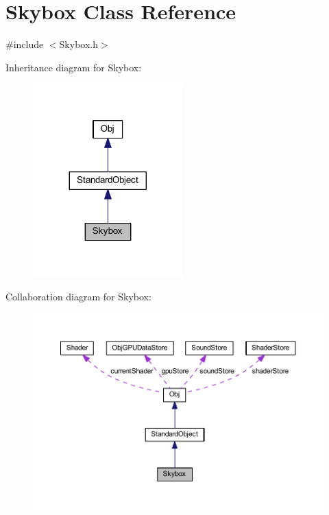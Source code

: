\hypertarget{class_skybox}{}\section{Skybox Class Reference}
\label{class_skybox}


{\ttfamily \#include $<$Skybox.\+h$>$}



Inheritance diagram for Skybox\+:
\nopagebreak
\begin{figure}[H]
\begin{center}
\leavevmode
\includegraphics[width=164pt]{class_skybox__inherit__graph}
\end{center}
\end{figure}


Collaboration diagram for Skybox\+:
\nopagebreak
\begin{figure}[H]
\begin{center}
\leavevmode
\includegraphics[width=350pt]{class_skybox__coll__graph}
\end{center}
\end{figure}
